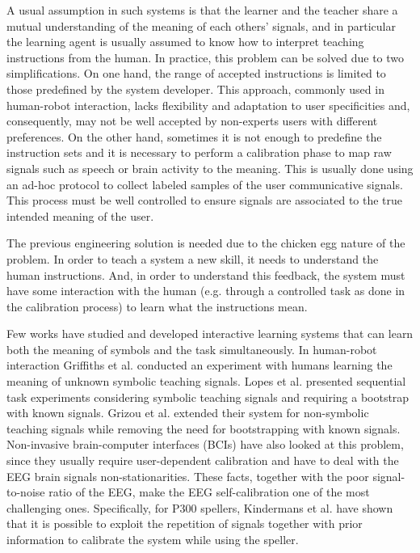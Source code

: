A usual assumption in such systems is that the learner and the teacher share a mutual understanding of the meaning of each others' signals, and in particular the learning agent is usually assumed to know how to interpret teaching instructions from the human. In practice, this problem can be solved due to two simplifications. On one hand, the range of accepted instructions is limited to those predefined by the system developer. This approach, commonly used in human-robot interaction, lacks flexibility and adaptation to user specificities and, consequently, may not be well accepted by non-experts users with different preferences. 
%
On the other hand, sometimes it is not enough to predefine the instruction sets and it is necessary to perform a calibration phase to map raw signals such as speech or brain activity to the meaning. This is usually done using an ad-hoc protocol to collect labeled samples of the user communicative signals. This process must be well controlled to ensure signals are associated to the true intended meaning of the user.

The previous engineering solution is needed due to the chicken egg nature of the problem. In order to teach a system a new skill, it needs to understand the human instructions. And, in order to understand this feedback, the system must have some interaction with the human (e.g. through a controlled task as done in the calibration process) to learn what the instructions mean. 

Few works have studied and developed interactive learning systems that can learn both the meaning of symbols and the task simultaneously. In human-robot interaction Griffiths et al. \cite{griffiths2012bottom} conducted an experiment with humans learning the meaning of unknown symbolic teaching signals. Lopes et al. \cite{macl11simul} presented sequential task experiments considering symbolic teaching signals and requiring a bootstrap with known signals. Grizou et al. \cite{grizou2013robot} extended their system for non-symbolic teaching signals while removing the need for bootstrapping with known signals. Non-invasive brain-computer interfaces (BCIs) have also looked at this problem, since they usually require user-dependent calibration and have to deal with the EEG brain signals non-stationarities. These facts, together with the poor signal-to-noise ratio of the EEG, make the EEG self-calibration one of the most challenging ones. Specifically, for P300 spellers, Kindermans et al. have shown that it is possible to exploit the repetition of signals together with prior information  \cite{Kindermans2012a,Kindermans2012b} to calibrate the system while using the speller.


